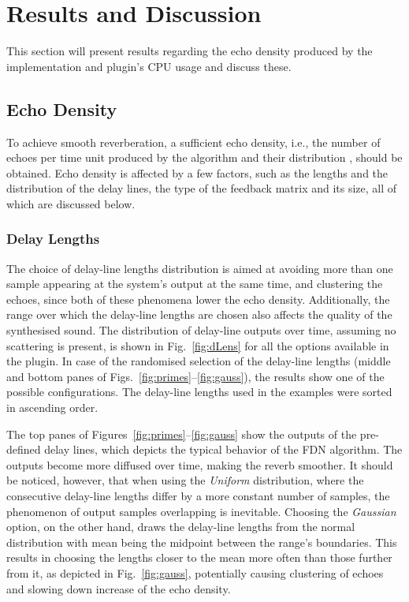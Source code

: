 \documentclass[twoside,a4paper]{article}
\begin{document}
\section{Results and Discussion}\label{sec:resDisc}

This section will present results regarding the echo density produced by the implementation and plugin's CPU usage and discuss these.

\subsection{Echo Density}
To achieve smooth reverberation, a sufficient echo density, i.e., the number of echoes per time unit produced by the algorithm and their distribution \cite{schlecht:2016:echo}, should be obtained. Echo density is affected by a few factors, such as the lengths and the distribution of the delay lines, the type of the feedback matrix and its size, all of which are discussed below.

\subsubsection{Delay Lengths} 
The choice of delay-line lengths distribution is aimed at avoiding more than one sample appearing at the system's output at the same time, and clustering the echoes, since both of these phenomena lower the echo density. Additionally, the range over which the delay-line lengths are chosen also affects the quality of the synthesised sound. The distribution of delay-line outputs over time, assuming no scattering is present, is shown in Fig.~\ref{fig:dLens} for all the options available in the plugin. In case of the randomised selection of the delay-line lengths (middle and bottom panes of Figs.~\ref{fig:primes}--\ref{fig:gauss}), the results show one of the possible configurations. The delay-line lengths used in the examples were sorted in ascending order.


The top panes of Figures~\ref{fig:primes}--\ref{fig:gauss} show the outputs of the pre-defined delay lines, which depicts the typical behavior of the FDN algorithm. The outputs become more diffused over time, making the reverb smoother. It should be noticed, however, that when using the \textit{Uniform} distribution, where the consecutive delay-line lengths differ by a more constant number of samples, the phenomenon of output samples overlapping is inevitable. Choosing the \textit{Gaussian} option, on the other hand, draws the delay-line lengths from the normal distribution with mean being the midpoint between the range's boundaries. This results in choosing the lengths closer to the mean more often than those further from it, as depicted in Fig.~\ref{fig:gauss}, potentially causing clustering of echoes and slowing down increase of the echo density. 
\end{document}
